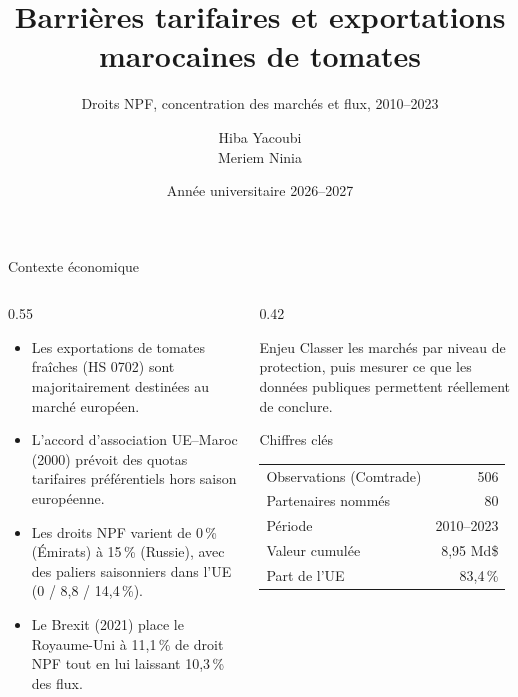 \documentclass[aspectratio=169,10pt]{beamer}
\title[Barrières tarifaires et exportations]{Barrières tarifaires et exportations marocaines de tomates}
\subtitle{Droits NPF, concentration des marchés et flux, 2010--2023}
\author[H.~Yacoubi \& M.~Ninia]{Hiba Yacoubi\\[0.25em]Meriem Ninia}
\institute{ENCG Settat --- Master Commerce International\\Projet 35 --- Data Science}
\date{Année universitaire 2026--2027}
\begin{document}
\begin{frame}[plain]
  \titlepage
\end{frame}

\begin{frame}{Contexte économique}
  \begin{columns}[T,onlytextwidth]
    \begin{column}{0.55\textwidth}
      \begin{itemize}
        \item Les exportations de tomates fraîches (HS 0702) sont
              majoritairement destinées au marché européen.
        \item L'accord d'association UE--Maroc (2000) prévoit des quotas
              tarifaires préférentiels hors saison européenne.
        \item Les droits NPF varient de 0\,\% (Émirats) à 15\,\%
              (Russie), avec des paliers saisonniers dans l'UE
              (0 / 8,8 / 14,4\,\%).
        \item Le Brexit (2021) place le Royaume-Uni à 11,1\,\% de droit NPF
              tout en lui laissant 10,3\,\% des flux.
      \end{itemize}
    \end{column}
    \begin{column}{0.42\textwidth}
      \begin{block}{Enjeu}
        Classer les marchés par niveau de protection, puis mesurer ce que
        les données publiques permettent réellement de conclure.
      \end{block}
      \begin{block}{Chiffres clés}
        \begin{tabular}{lr}
          \toprule
          Observations (Comtrade) & 506 \\
          Partenaires nommés & 80 \\
          Période & 2010--2023 \\
          Valeur cumulée & 8,95 Md\$ \\
          Part de l'UE & 83,4\,\% \\
          \bottomrule
        \end{tabular}
      \end{block}
    \end{column}
  \end{columns}
\end{frame}
\end{document}
